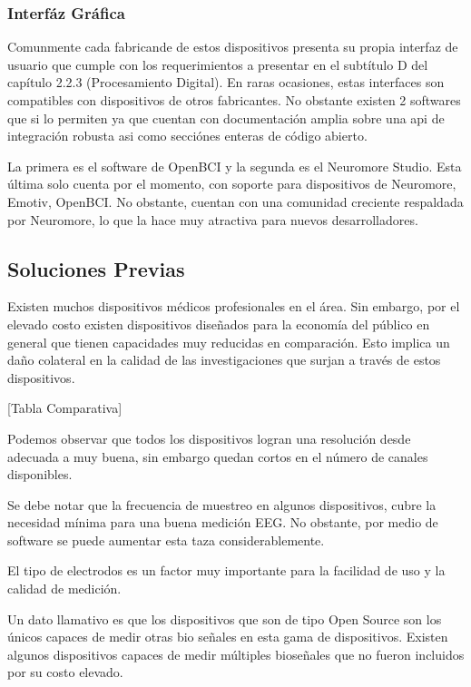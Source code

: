 \subsubsection{Interfáz Gráfica}
\label{sec:orgc467ac9}
Comunmente cada fabricande de estos dispositivos presenta su propia interfaz de usuario que cumple con los requerimientos a presentar en el subtítulo D del capítulo 2.2.3 (Procesamiento Digital). En raras ocasiones, estas interfaces son compatibles con dispositivos de otros fabricantes. No obstante existen 2 softwares que si lo permiten ya que cuentan con documentación amplia sobre una api de integración robusta asi como secciónes enteras de código abierto.

La primera es el software de OpenBCI y la segunda es el Neuromore Studio. Esta última solo cuenta por el momento, con soporte para dispositivos de Neuromore, Emotiv, OpenBCI. No obstante, cuentan con una comunidad creciente respaldada por Neuromore, lo que la hace muy atractiva para nuevos desarrolladores.

\subsection{Soluciones Previas}
\label{sec:org931316f}
Existen muchos dispositivos médicos profesionales en el área. Sin embargo, por el elevado costo existen dispositivos diseñados para la economía del público en general que tienen capacidades muy reducidas en comparación.
Esto implica un daño colateral en la calidad de las investigaciones que surjan a través de estos dispositivos.

[Tabla Comparativa]

Podemos observar que todos los dispositivos logran una resolución desde adecuada a muy buena, sin embargo quedan cortos en el número de canales disponibles.

Se debe notar que la frecuencia de muestreo en algunos dispositivos, cubre la necesidad mínima para una buena medición EEG. No obstante, por medio de software se puede aumentar esta taza considerablemente.

El tipo de electrodos es un factor muy importante para la facilidad de uso y la calidad de medición.

Un dato llamativo es que los dispositivos que son de tipo Open Source son los únicos capaces de medir otras bio señales en esta gama de dispositivos. Existen algunos dispositivos capaces de medir múltiples bioseñales que no fueron incluidos por su costo elevado.

